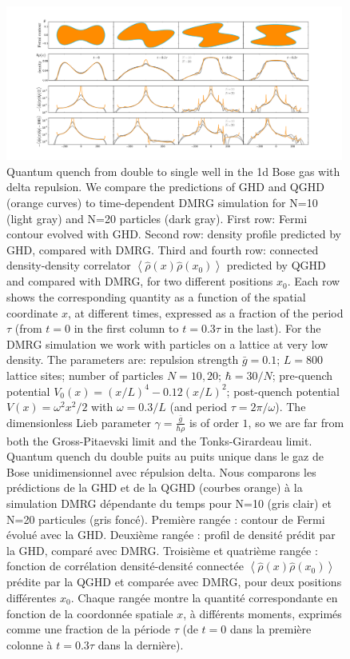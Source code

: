 \documentclass[twocolumn,amsfonts,showpacs,superscriptaddress]{revtex4-1}
\newcommand{\trad}[1]{\textcolor{myblue}{#1}}
\begin{document}
\begin{figure}[t]
\centering
\includegraphics[width = 0.99\textwidth]{fig2.pdf}
\caption{Quantum quench from double to single well in the 1d Bose gas with delta repulsion. We compare the predictions of GHD and QGHD (orange curves) to time-dependent DMRG simulation for N=10 (light gray) and N=20 particles (dark gray). First row: Fermi contour evolved with GHD. Second row: density profile predicted by GHD, compared with DMRG. Third and fourth row: connected density-density correlator $\left< \hat{\rho} (x) \hat{\rho} (x_0)\right>$ predicted by QGHD and compared with DMRG, for two different positions $x_0$. Each row shows the corresponding quantity as a function of the spatial coordinate $x$, at different times, expressed as a fraction of the period $\tau$ (from $t=0$ in the first column to $t=0.3 \tau$ in the last). 
For the DMRG simulation we work with particles on a lattice at very low density. The parameters are: repulsion strength $\bar{g} = 0.1$; $L=800$ lattice sites; number of particles $N=10, 20$; $\hbar = 30/N$; pre-quench potential $V_0(x)= (x/L)^4 - 0.12 (x/L)^2$; post-quench potential $V(x) = \omega^2 x^2 /2$ with $\omega=0.3/L$ (and period $\tau= 2\pi/\omega$). The dimensionless Lieb parameter $\gamma = \frac{\bar{g}}{\hbar \rho}$ is of order $1$, so we are far from both the Gross-Pitaevski limit and the Tonks-Girardeau limit.
\trad{Quantum quench du double puits au puits unique dans le gaz de Bose unidimensionnel avec répulsion delta. Nous comparons les prédictions de la GHD et de la QGHD (courbes orange) à la simulation DMRG dépendante du temps pour N=10 (gris clair) et N=20 particules (gris foncé). Première rangée : contour de Fermi évolué avec la GHD. Deuxième rangée : profil de densité prédit par la GHD, comparé avec DMRG. Troisième et quatrième rangée : fonction de corrélation densité-densité connectée $\left< \hat{\rho} (x) \hat{\rho} (x_0)\right>$ prédite par la QGHD et comparée avec DMRG, pour deux positions différentes $x_0$. Chaque rangée montre la quantité correspondante en fonction de la coordonnée spatiale $x$, à différents moments, exprimés comme une fraction de la période $\tau$ (de $t=0$ dans la première colonne à $t=0.3 \tau$ dans la dernière). 
}}
\end{figure}
\end{document}
